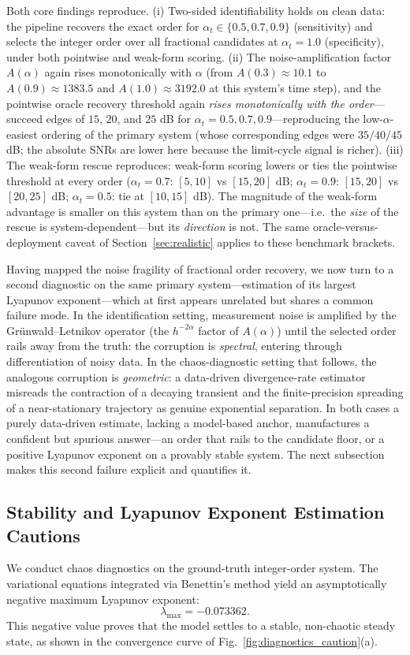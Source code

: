 \documentclass[review,3p,times]{elsarticle}
\begin{document}
Both core findings reproduce. (i) Two-sided identifiability holds on clean data: the pipeline recovers the exact order for $\alpha_t \in \{0.5, 0.7, 0.9\}$ (sensitivity) and selects the integer order over all fractional candidates at $\alpha_t = 1.0$ (specificity), under both pointwise and weak-form scoring. (ii) The noise-amplification factor $A(\alpha)$ again rises monotonically with $\alpha$ (from $A(0.3)\approx 10.1$ to $A(0.9)\approx 1383.5$ and $A(1.0)\approx 3192.0$ at this system's time step), and the pointwise oracle recovery threshold again \emph{rises monotonically with the order}---succeed edges of $15$, $20$, and $25$ dB for $\alpha_t = 0.5, 0.7, 0.9$---reproducing the low-$\alpha$-easiest ordering of the primary system (whose corresponding edges were $35/40/45$ dB; the absolute SNRs are lower here because the limit-cycle signal is richer). (iii) The weak-form rescue reproduces: weak-form scoring lowers or ties the pointwise threshold at every order ($\alpha_t=0.7$: $[5,10]$ vs $[15,20]$ dB; $\alpha_t=0.9$: $[15,20]$ vs $[20,25]$ dB; $\alpha_t=0.5$: tie at $[10,15]$ dB). The magnitude of the weak-form advantage is smaller on this system than on the primary one---i.e.\ the \emph{size} of the rescue is system-dependent---but its \emph{direction} is not. The same oracle-versus-deployment caveat of Section~\ref{sec:realistic} applies to these benchmark brackets.

Having mapped the noise fragility of fractional order recovery, we now turn to a second diagnostic on the same primary system---estimation of its largest Lyapunov exponent---which at first appears unrelated but shares a common failure mode. In the identification setting, measurement noise is amplified by the Gr\"unwald--Letnikov operator (the $h^{-2\alpha}$ factor of $A(\alpha)$) until the selected order rails away from the truth: the corruption is \emph{spectral}, entering through differentiation of noisy data. In the chaos-diagnostic setting that follows, the analogous corruption is \emph{geometric}: a data-driven divergence-rate estimator misreads the contraction of a decaying transient and the finite-precision spreading of a near-stationary trajectory as genuine exponential separation. In both cases a purely data-driven estimate, lacking a model-based anchor, manufactures a confident but spurious answer---an order that rails to the candidate floor, or a positive Lyapunov exponent on a provably stable system. The next subsection makes this second failure explicit and quantifies it.

\subsection{Stability and Lyapunov Exponent Estimation Cautions}
\label{sec:lyapunov}
We conduct chaos diagnostics on the ground-truth integer-order system. The variational equations integrated via Benettin's method yield an asymptotically negative maximum Lyapunov exponent:
\begin{equation}
\lambda_{\max} = -0.073362.
\end{equation}
This negative value proves that the model settles to a stable, non-chaotic steady state, as shown in the convergence curve of Fig.~\ref{fig:diagnostics_caution}(a).
\end{document}
